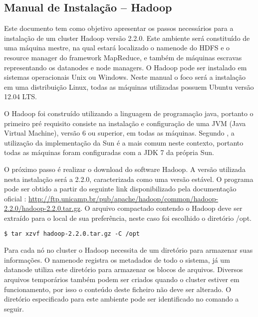 \begin{apendicesenv}

\chapter{Manual de Instalação – Hadoop}
\label{apd-hadoop}

Este documento tem como objetivo apresentar os passos necessários para a instalação de um cluster Hadoop versão 2.2.0. Este ambiente será constituído de uma máquina mestre, na qual estará localizado o namenode do HDFS e o resource manager do framework MapReduce, e também de máquinas escravas representando os datanodes e node managers. O Hadoop pode ser instalado em sistemas operacionais Unix ou Windows. Neste manual o foco será a instalação em uma distribuição Linux, todas as máquinas utilizadas possuem Ubuntu versão 12.04 LTS.

O Hadoop foi construído utilizando a linguagem de programação java, portanto o primeiro pré requisito consiste na instalação e configuração de uma JVM (Java Virtual Machine), versão 6 ou superior, em todas as máquinas. Segundo , a utilização da implementação da Sun é a mais comum neste contexto, portanto todas as máquinas foram configuradas com a JDK 7 da própria Sun.

O próximo passo é realizar o download do software Hadoop. A versão utilizada nesta instalação será a 2.2.0, caracterizada como uma versão estável. O programa pode ser obtido a partir do seguinte link disponibilizado pela documentação oficial \cite{hadoopSite}: \url{http://ftp.unicamp.br/pub/apache/hadoop/common/hadoop-2.2.0/hadoop-2.2.0.tar.gz}. O arquivo compactado contendo o Hadoop deve ser extraído para o local de sua preferência, neste caso foi escolhido o diretório /opt.

\begin{lstlisting}[style=abnt,frame=single]
$ tar xzvf hadoop-2.2.0.tar.gz -C /opt
\end{lstlisting}

Para cada nó no cluster o Hadoop necessita de um diretório para armazenar suas informações. O namenode registra os metadados de todo o sistema, já um datanode utiliza este diretório para armazenar os blocos de arquivos. Diversos arquivos temporários também podem ser criados quando o cluster estiver em funcionamento, por isso o conteúdo deste ficheiro não deve ser alterado. O diretório especificado para este ambiente pode ser identificado no comando a seguir.


\end{apendicesenv}
